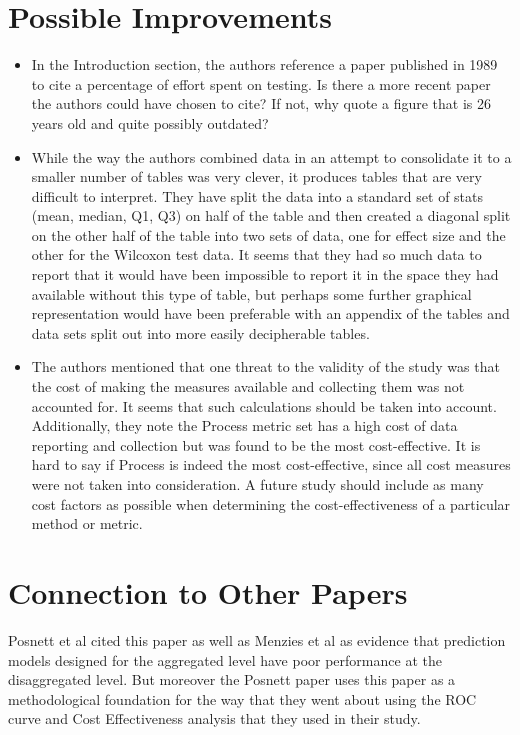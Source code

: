 \documentclass[english]{article}
\begin{document}
\section*{Possible Improvements}
\begin{itemize}
\item In the Introduction section, the authors reference a paper published
in 1989 to cite a percentage of effort spent on testing. Is there
a more recent paper the authors could have chosen to cite? If not,
why quote a figure that is 26 years old and quite possibly outdated? 
\item While the way the authors combined data in an attempt to consolidate
it to a smaller number of tables was very clever, it produces tables
that are very difficult to interpret. They have split the data into
a standard set of stats (mean, median, Q1, Q3) on half of the table
and then created a diagonal split on the other half of the table into
two sets of data, one for effect size and the other for the Wilcoxon
test data. It seems that they had so much data to report that it would
have been impossible to report it in the space they had available
without this type of table, but perhaps some further graphical representation
would have been preferable with an appendix of the tables and data
sets split out into more easily decipherable tables. 
\item The authors mentioned that one threat to the validity of the study
was that the cost of making the measures available and collecting
them was not accounted for. It seems that such calculations should
be taken into account. Additionally, they note the Process metric
set has a high cost of data reporting and collection but was found
to be the most cost-effective. It is hard to say if Process is indeed
the most cost-effective, since all cost measures were not taken into
consideration. A future study should include as many cost factors
as possible when determining the cost-effectiveness of a particular
method or metric.
\end{itemize}

\section*{Connection to Other Papers}

Posnett et al \cite{posnett11} cited this paper as well as Menzies
et al \cite{menzies10} as evidence that prediction models designed
for the aggregated level have poor performance at the disaggregated
level. But moreover the Posnett paper uses this paper as a methodological
foundation for the way that they went about using the ROC curve and
Cost Effectiveness analysis that they used in their study.

 

 {}  
\end{document}
